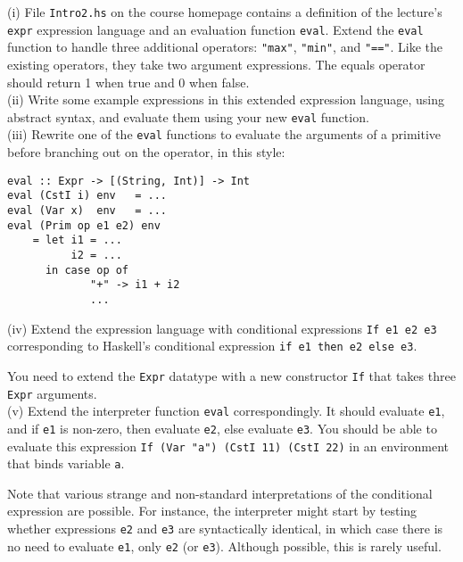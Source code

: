 \documentclass[a4paper]{article}
\begin{document}
\begin{exercise}\label{exer-expr-more-if}
(i) File \texttt{Intro2.hs} on the course homepage contains a definition
of the lecture's \texttt{expr} expression language and an evaluation
function \texttt{eval}.  Extend the \texttt{eval} function to handle
three additional operators: \texttt{"max"}, \texttt{"min"}, and
\texttt{"=="}.  Like the existing operators, they take two argument
expressions.  The
equals operator should return 1 when true and 0 when false.\\

\noindent 
(ii) Write some example expressions in this extended expression
language, using abstract syntax, and evaluate them using your new
\texttt{eval} function.\\

\noindent
(iii) Rewrite one of the \texttt{eval} functions to evaluate the
arguments of a primitive before branching out on the operator, in this
style:

{\codesetup\begin{verbatim}
eval :: Expr -> [(String, Int)] -> Int 
eval (CstI i) env   = ...
eval (Var x)  env   = ...
eval (Prim op e1 e2) env 
    = let i1 = ...
          i2 = ...
      in case op of
             "+" -> i1 + i2 
             ...
\end{verbatim}}

\noindent
(iv) Extend the expression language with conditional expressions
\texttt{If e1 e2 e3} corresponding to Haskell's conditional expression \texttt{if e1
  then e2 else e3}.
  
You need to extend the \texttt{Expr} datatype with a new constructor
\texttt{If} that takes three \texttt{Expr} arguments.\\

\noindent
(v) Extend the interpreter function \texttt{eval} correspondingly.  It
should evaluate \texttt{e1}, and if \texttt{e1} is non-zero, then
evaluate \texttt{e2}, else evaluate \texttt{e3}.  You should be able
to evaluate this expression \texttt{If (Var "a") (CstI 11) (CstI
  22)} in an environment that binds variable \texttt{a}.
    
Note that various strange and non-standard interpretations of the
conditional expression are possible.  For instance, the interpreter
might start by testing whether expressions \texttt{e2} and \texttt{e3}
are syntactically identical, in which case there is no need to
evaluate \texttt{e1}, only \texttt{e2} (or \texttt{e3}).  Although
possible, this is rarely useful.
\end{exercise}
\end{document}
